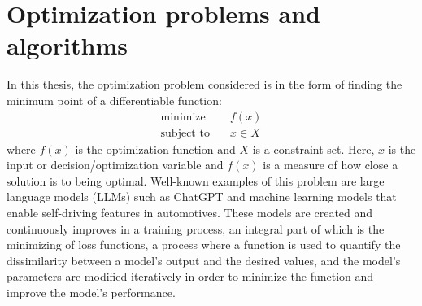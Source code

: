 \section{Optimization problems and algorithms} \label{OpPro}

In this thesis, the optimization problem considered is in the form of finding the minimum point of a differentiable function:
\begin{subequations}\label{opt prob}
  \begin{align}
    \textrm{minimize} &\quad f(x) \\
    \textrm{subject to} &\quad x \in X
  \end{align}
\end{subequations}
where \(f(x)\) is the optimization function and \(X\) is a constraint set. Here, \(x\) is the input or decision/optimization variable and \(f(x)\) is a measure of how close a solution is to being optimal. Well-known examples of this problem are large language models (LLMs) such as ChatGPT and machine learning models that enable self-driving features in automotives. These models are created and continuously improves in a training process, an integral part of which is the minimizing of loss functions, a process where a function is used to quantify the dissimilarity between a model's output and the desired values, and the model's parameters are modified iteratively in order to minimize the function and improve the model's performance.

